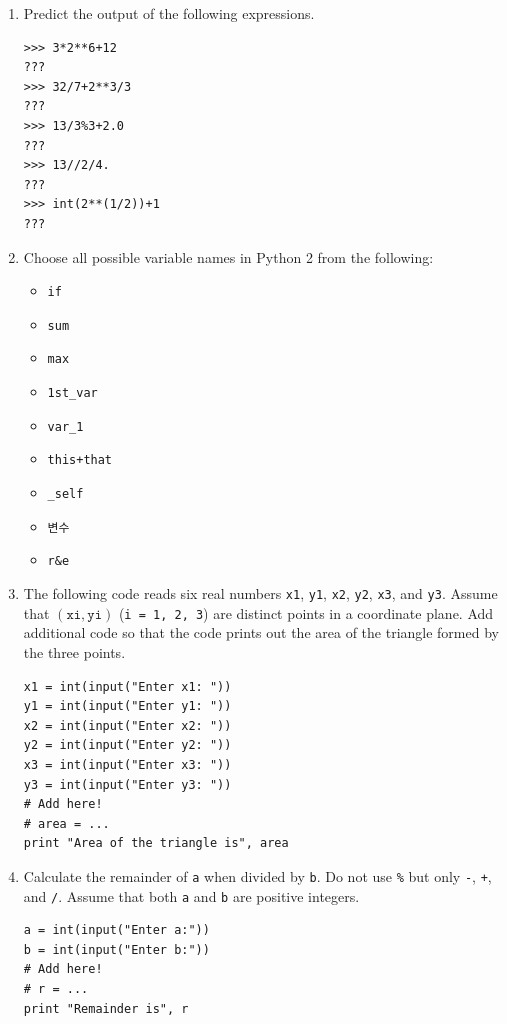 \documentclass[../main.tex]{subfiles}
\begin{document}
\begin{enumerate}
\item Predict the output of the following expressions.
\begin{verbatim}
>>> 3*2**6+12
???
>>> 32/7+2**3/3
???
>>> 13/3%3+2.0
???
>>> 13//2/4.
???
>>> int(2**(1/2))+1
???
\end{verbatim}

\item Choose all possible variable names in Python 2 from the following:
\begin{itemize}
\item \texttt{if}
\item \texttt{sum}
\item \texttt{max}
\item \texttt{1st\_var}
\item \texttt{var\_1}
\item \texttt{this+that}
\item \texttt{\_self}
\item \texttt{변수}
\item \texttt{r\&e}
\end{itemize}

\item The following code reads six real numbers \texttt{x1}, \texttt{y1}, \texttt{x2}, \texttt{y2}, \texttt{x3}, and \texttt{y3}.
Assume that $(\texttt{xi}, \texttt{yi})$ (\texttt{i = 1, 2, 3}) are distinct points in a coordinate plane.
Add additional code so that the code prints out the area of the triangle formed by the three points.
\begin{verbatim}
x1 = int(input("Enter x1: "))
y1 = int(input("Enter y1: "))
x2 = int(input("Enter x2: "))
y2 = int(input("Enter y2: "))
x3 = int(input("Enter x3: "))
y3 = int(input("Enter y3: "))
# Add here!
# area = ...
print "Area of the triangle is", area
\end{verbatim}

\item Calculate the remainder of \texttt{a} when divided by \texttt{b}.
Do not use \texttt{\%} but only \texttt{-}, \texttt{+}, and \texttt{/}.
Assume that both \texttt{a} and \texttt{b} are positive integers.
\begin{verbatim}
a = int(input("Enter a:"))
b = int(input("Enter b:"))
# Add here!
# r = ...
print "Remainder is", r
\end{verbatim}


\end{enumerate}
\end{document}
